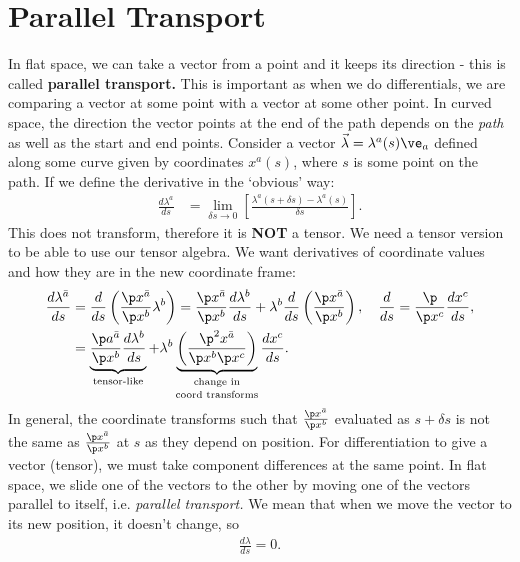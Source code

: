 \documentclass[a4paper, 11pt, normalem]{report}
\begin{document}
\section{Parallel Transport}
In flat space, we can take a vector from a point and it keeps its direction - this is called \textbf{parallel transport.}
This is important as when we do differentials, we are comparing a vector at some point with a vector at some other point. 
In curved space, the direction the vector points at the end of the path depends on the \emph{path} as well as the start and end points. 
Consider a vector $\vec{\lambda}=\lambda^a(s)\ve_a$ defined along some curve given by coordinates $x^a(s)$, where $s$ is some point on the path. 
If we define the derivative in the `obvious' way:
\begin{align}
    \frac{d\lambda^a}{ds} &= \lim_{\delta s\to0} \left[\frac{\lambda^a(s+\delta s)-\lambda^a(s)}{\delta s}\right].
\end{align}
This does not transform, therefore it is \textbf{NOT} a tensor.
We need a tensor version to be able to use our tensor algebra. 
We want derivatives of coordinate values and how they are in the new coordinate frame:
\begin{align}
    \begin{split}
        \frac{d\lambda^{\bar{a}}}{ds} &= \frac{d}{ds}\left(\frac{\p x^{\bar{a}}}{\p x^b}\lambda^b\right) = \frac{\p x^{\bar{a}}}{\p x^b}\frac{d\lambda^b}{ds} + \lambda^b\frac{d}{ds}\left(\frac{\p x^{\bar{a}}}{\p x^b}\right),\quad \frac{d}{ds} = \frac{\p}{\p x^c}\frac{dx^c}{ds}, \\
                                      &= \underbrace{\frac{\p a^{\bar{a}}}{\p x^b}\frac{d\lambda^b}{ds}}_{\text{tensor-like}} + \lambda^b\underbrace{\left(\frac{\p^2x^{\bar{a}}}{\p x^b\p x^c}\right)}_{\text{\shortstack{change in\\ coord transforms}}}\frac{dx^c}{ds}.
    \end{split}
\end{align}
In general, the coordinate transforms such that $\frac{\p x^{\bar{a}}}{\p x^b}$ evaluated as $s+\delta s$ is not the same as $\frac{\p x^{\bar{a}}}{\p x^b}$ at $s$ as they depend on position. 
For differentiation to give a vector (tensor), we must take component differences at the same point.
In flat space, we slide one of the vectors to the other by moving one of the vectors parallel to itself, i.e. \emph{parallel transport.}
We mean that when we move the vector to its new position, it doesn't change, so
\begin{align}
    \frac{d\lambda}{ds}=0.
\end{align}
\end{document}

